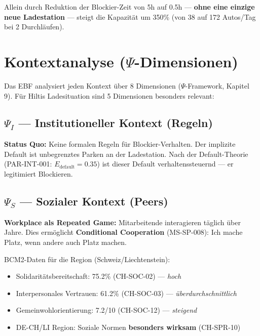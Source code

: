 \documentclass[11pt,a4paper]{article}
\begin{document}
\begin{keyinsight}
Allein durch Reduktion der Blockier-Zeit von 5h auf 0.5h --- \textbf{ohne eine einzige neue Ladestation} --- steigt die Kapazit\"at um 350\% (von 38 auf 172 Autos/Tag bei 2 Durchl\"aufen).
\end{keyinsight}


\section{Kontextanalyse ($\Psi$-Dimensionen)}

Das EBF analysiert jeden Kontext \"uber 8 Dimensionen ($\Psi$-Framework, Kapitel 9). F\"ur Hiltis Ladesituation sind 5 Dimensionen besonders relevant:

\subsection{$\Psi_I$ --- Institutioneller Kontext (Regeln)}

\textbf{Status Quo:} Keine formalen Regeln f\"ur Blockier-Verhalten. Der implizite Default ist \guillemotleft unbegrenztes Parken an der Ladestation\guillemotright. Nach der Default-Theorie (PAR-INT-001: $E_{\text{default}} = 0.35$) ist dieser Default verhaltenssteuernd --- er legitimiert Blockieren.

\subsection{$\Psi_S$ --- Sozialer Kontext (Peers)}

\textbf{Workplace als Repeated Game:} Mitarbeitende interagieren t\"aglich \"uber Jahre. Dies erm\"oglicht \textbf{Conditional Cooperation} (MS-SP-008): \guillemotleft Ich mache Platz, wenn andere auch Platz machen.\guillemotright

BCM2-Daten f\"ur die Region (Schweiz/Liechtenstein):
\begin{itemize}[noitemsep]
\item Solidarit\"atsbereitschaft: 75.2\% (CH-SOC-02) --- \textit{hoch}
\item Interpersonales Vertrauen: 61.2\% (CH-SOC-03) --- \textit{\"uberdurchschnittlich}
\item Gemeinwohlorientierung: 7.2/10 (CH-SOC-12) --- \textit{steigend}
\item DE-CH/LI Region: Soziale Normen \textbf{besonders wirksam} (CH-SPR-10)
\end{itemize}
\end{document}
